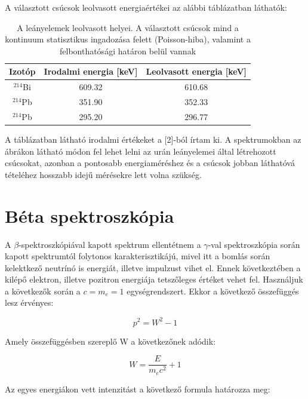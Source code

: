 \documentclass[12pt,a4paper]{article}
\begin{document}
A választott csúcsok leolvasott energiaértékei az alábbi táblázatban láthatók:
\begin{table}[!h]
\begin{center}
\begin{tabular}{|c|c|c|}
\hline
Izotóp & Irodalmi energia [keV] & Leolvasott energia [keV]\\
\hline
$^{214}$Bi & 609.32 & 610.68\\
\hline
$^{214}$Pb & 351.90 & 352.33\\
\hline
$^{214}$Pb & 295.20 & 296.77\\ 
\hline
\end{tabular}
\caption{A leányelemek leolvasott helyei. A választott csúcsok mind a kontinuum statisztikus ingadozása felett (Poisson-hiba), valamint a felbonthatósági határon belül vannak}
\end{center}
\end{table}

A táblázatban látható irodalmi értékeket a [2]-ból írtam ki. A spektrumokban az ábrákon látható módon fel lehet lelni az urán leányelemei által létrehozott csúcsokat, azonban a pontosabb energiaméréshez és a csúcsok jobban láthatóvá tételéhez hosszabb idejű mérésekre lett volna szükség. 


\section{Béta spektroszkópia}

A $\beta$-spektroszkópiával kapott spektrum ellentétnem a $\gamma$-val spektroszkópia során kapott spektrumtól folytonos karakterisztikájú, mivel itt a bomlás során kelektkező neutrínó is energiát, illetve impulzust vihet el. Ennek következtében a kilépő elektron, illetve pozitron energiája tetszőleges értéket vehet fel. Használjuk a következők során a $c=m_e=1$ egységrendszert. Ekkor a következő összefüggés lesz érvényes:

\begin{equation*}
p^2= W^2 - 1
\end{equation*}

Amely összefüggésben szereplő W a következőnek adódik:

\begin{equation*}
W= \dfrac{E}{m_ec^2} + 1
\end{equation*}

Az egyes energiákon vett intenzitást a következő formula határozza meg:
\end{document}
